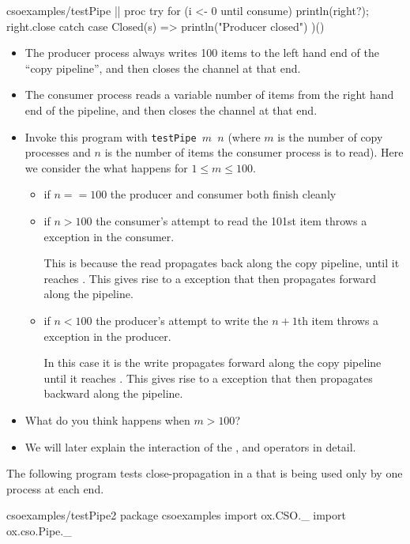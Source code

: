\documentclass{concdistfoils}
\begin{document}
\begin{slide}
\begin{obj}{csoexamples/testPipe}
{{    || proc { try { for (i <- 0 until consume) println(right?); right.close }
              catch { case Closed(s)  => println("Producer closed") }}
    )()
  }
}
\end{obj}
\begin{note}
\begin{itemize}
\item The producer process always writes 100 items to the left hand end
of the ``copy pipeline'', and then closes the channel at that end.
\item The consumer process reads a variable number of items from the
right hand end of the pipeline, and then closes the channel at that end.
\item Invoke this program with \texttt{testPipe $m$ $n$} (where $m$ is the number of
copy processes and $n$ is the number of items the consumer process is to read). Here
we consider the what happens for $1\leq m\leq 100$.
\begin{itemize}
\item if $n==100$ the producer and consumer both finish cleanly
\item if $n>100$ the consumer's attempt to read the 101st item throws a 
      exception in the consumer. 
      
      This is because the read propagates back along the copy
      pipeline, until it reaches . This gives rise
      to a  exception that then propagates forward
      along the pipeline.

\item if $n<100$ the producer's attempt to write the $n+1$th item throws a 
       exception in the producer.
      
      In this case it is the write propagates forward along the copy
      pipeline until it reaches . This gives rise 
      to a  exception that then propagates backward
      along the pipeline.
\end{itemize}
\item What do you think happens when $m>100$?

\item We will later explain the interaction of the , and 
       operators in detail.
\end{itemize}

The following program tests close-propagation in a  that
is being used only by one process at each end.
\begin{obj}{csoexamples/testPipe2}
package csoexamples
import  ox.CSO._
import  ox.cso.Pipe._


\end{obj}
\end{note}
\end{slide}
\end{document}
